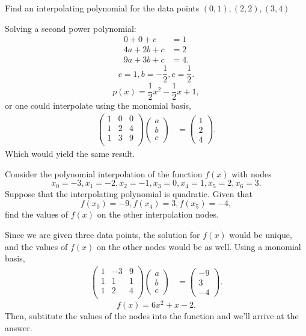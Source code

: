 \documentclass[5pt, a4paper]{article}
\begin{document}
\begin{tcolorbox}[title=Question 1]
    Find an interpolating polynomial for the data points $(0,1),(2,2), (3,4)$
\end{tcolorbox}

Solving a second power polynomial: 
\begin{align*}
    0 + 0 + c &= 1 \\
    4a + 2b + c &= 2 \\
    9a + 3b + c &= 4 
.\end{align*}
\[
    c = 1, b = -\frac{1}{2}, c = \frac{1}{2}
.\] 
\[
p(x) = \frac{1}{2}x^2 - \frac{1}{2}x + 1
,\] 
or one could interpolate using the monomial basis, 
\begin{align*}
    \begin{pmatrix}
        1 & 0 & 0 \\ 
        1 & 2 & 4 \\ 
        1 & 3 & 9 \\ 
    \end{pmatrix} 
    \begin{pmatrix} a \\ b \\ c \end{pmatrix} 
    &= \begin{pmatrix} 1 \\ 2 \\ 4 \end{pmatrix}  
.\end{align*}
Which would yield the same result.


\begin{tcolorbox}[title=Question 2]
    Consider the polynomial interpolation of the function $f(x)$ with nodes  \[
    x_0=-3, x_1=-2, x_2 = -1, x_3 = 0, x_4=1, x_5 = 2, x_6 = 3
    .\] 
    Suppose that the interpolating polynomial is quadratic. Given that \[
    f(x_0) = -9, f(x_4) = 3, f(x_5) = -4
    ,\] 
    find the values of $f(x)$ on the other interpolation nodes.
\end{tcolorbox}

Since we are given three data points, the solution for $f(x)$ would be unique,
and the values of $f(x)$ on the other nodes would be as well. Using a monomial
basis,
\begin{align*}
    \begin{pmatrix} 
        1 & -3 & 9 \\ 
        1 & 1 & 1 \\ 
        1 & 2 & 4 \\
    \end{pmatrix} 
    \begin{pmatrix} a \\ b \\ c \end{pmatrix} 
    &= \begin{pmatrix} -9 \\ 3 \\ -4 \end{pmatrix}  
.\end{align*}
\[
f(x) = 6x^2 + x - 2
.\] 
Then, subtitute the values of the nodes into the function and we'll arrive at
the answer.
\end{document}
